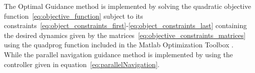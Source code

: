 The Optimal Guidance method is implemented by solving the quadratic objective function~\ref{eq:objective_function} subject to its constraints~\ref{eq:object_constraints_first}-\ref{eq:object_constraints_last} containing the desired dynamics given by the matrices~\ref{eq:objective_constraints_matrices} using the quadprog function included in the Matlab Optimization Toolbox \citep{MatlabOTB}. While the parallel navigation guidance method is implemented by using the controller given in equation~\ref{eq:parallelNavigation}.

